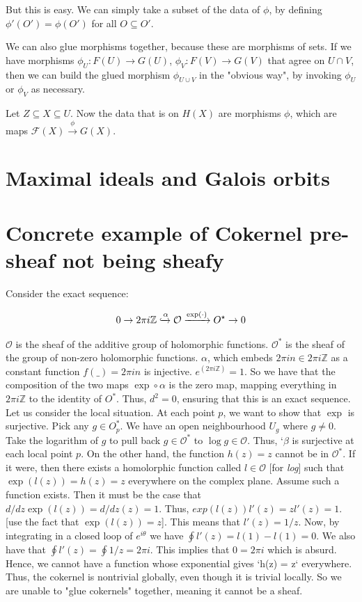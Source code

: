 \documentclass{book}
\newcommand{\F}{\ensuremath{\mathcal{F}}}
\newcommand{\Z}{\ensuremath{\mathbb{Z}}}
\renewcommand{\O}{\ensuremath{\mathcal{O}}}
\theoremstyle{definition}
\begin{document}
But this is easy. We can simply take a subset of the data of $\phi$, 
by defining $\phi'(O') = \phi(O')$ for all $O \subseteq O'$.    

We can also glue morphisms together, because these are morphisms of sets.
If we have morphisms $\phi_U: F(U) \rightarrow G(U)$, $\phi_V: F(V) \rightarrow G(V)$
that agree on $U \cap V$, then we can build the glued morphism 
$\phi_{U \cup V}$ in the "obvious way", by invoking $\phi_U$ or $\phi_V$
as necessary.


Let $Z \subseteq X \subseteq U$. Now the data that is on $H(X)$ are morphisms
$\phi$, which are maps $\F(X) \xrightarrow{\phi} G(X)$.

\section{Maximal ideals and Galois orbits}

\section{Concrete example of Cokernel pre-sheaf not being sheafy}

Consider the exact sequence:

$$
0  \rightarrow 2\pi i\Z \xhookrightarrow{\alpha} \O \xrightarrow{\exp(\cdot)} O^\star \rightarrow 0
$$


$\O$ is the sheaf of the additive group of holomorphic functions. 
$\O^*$ is the sheaf of the group of non-zero holomorphic functions. 
$\alpha$, which embeds $2\pi i n \in 2 \pi i\Z$ as a constant function $f(\_) = 2\pi i n$ is
  injective.
$e^(2\pi i\Z) = 1$. So we have that the composition of the two maps $\exp \circ \alpha$ is
the zero map, mapping everything in $2 \pi i \Z$ to the identity of $O^*$.
Thus, $d^2 = 0$, ensuring that this is an exact sequence.
Let us consider the local situation. At each point $p$, we want to show
that $\exp$ is surjective. Pick any $ g \in O^*_p$. We have an open neighbourhood $U_g$
where $g \neq 0$. Take the logarithm of $g$ to pull back $g \in \O^*$ to $\log g \in \O$.
Thus, `$\beta$ is surjective at each local point $p$.
On the other hand, the function $h(z) = z$ cannot be in $\O^*$. If it were,
then there exists a homolorphic function called $l \in \O$ [for \emph{log}] such that
$\exp(l(z)) = h(z) = z$ everywhere on the complex plane. 
Assume such a function exists. Then it must be the case that
$d/dz \exp(l(z)) = d/dz(z) = 1$. Thus, $exp(l(z)) l'(z) = z l'(z) = 1$.
[use the fact that $\exp(l(z)) = z$]. This means that $l'(z) = 1/z$.
Now, by integrating in a closed loop of $e^{i \theta}$ we have $\oint l'(z) = l(1) - l(1) = 0$.
We also have that $\oint l'(z) = \oint 1/z = 2\pi i$.
This implies that $0 = 2\pi i$ which is absurd.
Hence, we cannot have a function whose exponential gives `h(z) = z` everywhere.
Thus, the cokernel is nontrivial globally, even though it is trivial locally.
So we are unable to "glue cokernels" together, meaning it cannot
be a sheaf.
\end{document}
